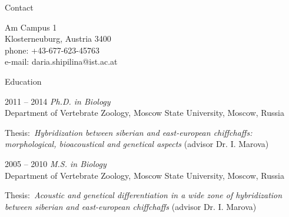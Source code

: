 \documentclass[10pt]{article}
\date{}
\newenvironment{sublist}{%
	\begin{list}{}{%
		\setlength{\itemsep}{0em}\setlength{\parsep}{0em}%
		\setlength{\topsep}{0em}\setlength{\parskip}{0em}%
	}%
}%
{ \end{list} }
\begin{document}


\newlength{\oldcvlabelwidth}
\renewcommand*{\cvbibname}{}




\begin{cv}%



\begin{cvlist}{Contact}
    \item Am Campus 1\\
     Klosterneuburg, Austria 3400\\
      phone: +43-677-623-45763\\
      e-mail: daria.shipilina@ist.ac.at%
\end{cvlist}



\begin{cvlist}{Education}
\item[2011 -- 2014]   \emph{Ph.D. in Biology}\\
       Department of Vertebrate Zoology,  Moscow State University, Moscow, Russia
        \begin{sublist}
     		\item Thesis:~\textit{Hybridization between siberian and east-european chiffchaffs: morphological,  bioacoustical and genetical aspects} (advisor Dr. I. Marova) %
	       \end{sublist}
	\item[2005 -- 2010] \emph{M.S. in Biology}\\
             Department of Vertebrate Zoology,  Moscow State University, Moscow, Russia
        \begin{sublist}
		\item Thesis:~\textit{Acoustic and genetical differentiation in a wide zone of hybridization between siberian and east-european chiffchaffs} (advisor Dr. I. Marova)
	       \end{sublist}
\end{cvlist}



\end{cv}
\end{document}
